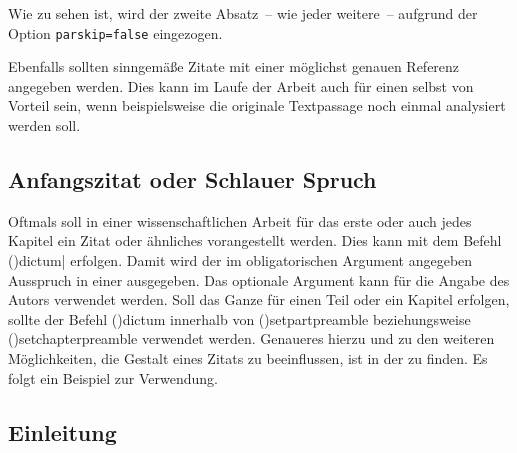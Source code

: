 \documentclass[%
  english,ngerman,%
  cdgeometry=no,DIV=12,%
  cd=false,cdfont=false,cdtitle=true,%
  headings=normal,%
  automark,%
  listof=toc,%
]{tudscrartcl}
\begin{document}
\begin{refsection}
\begin{Trunk*}
\begin{quoting}
{  Wie zu sehen ist, wird der zweite Absatz~-- wie jeder weitere~-- 
  aufgrund der Option \texttt{parskip=false} eingezogen.
}
\cite[sinngemäß nach][\pno{} 12, zweiter Absatz]{hanisch19}
\end{quoting}
\end{Trunk*}
\begin{Trunk+}
Ebenfalls sollten sinngemäße Zitate mit einer möglichst genauen Referenz 
angegeben werden. Dies kann im Laufe der Arbeit auch für einen selbst von 
Vorteil sein, wenn beispielsweise die originale Textpassage noch einmal 
analysiert werden soll.

\end{Trunk+}
\begin{quoting}[rightmargin=0pt]
\makeatletter
\let\markboth\@gobbletwo
\let\markright\@gobble
\makeatother
\printbibliography
\end{quoting}
\end{refsection}



\section{Anfangszitat oder Schlauer Spruch}

\renewcommand*\dictumwidth{.4\textwidth}%
%
\bigskip\noindent
Oftmals soll in einer wissenschaftlichen Arbeit für das erste oder auch jedes 
Kapitel ein Zitat oder ähnliches vorangestellt werden. Dies kann mit dem Befehl
\Macro(){dictum|}
erfolgen. Damit wird der im obligatorischen Argument angegeben Ausspruch in 
einer  ausgegeben. Das optionale Argument kann für die Angabe 
des Autors verwendet werden. Soll das Ganze für einen Teil oder ein Kapitel 
erfolgen, sollte der Befehl \Macro(){dictum} innerhalb 
von \Macro(){setpartpreamble} beziehungsweise 
\Macro(){setchapterpreamble} verwendet werden. Genaueres 
hierzu und zu den weiteren Möglichkeiten, die Gestalt eines Zitats zu 
beeinflussen, ist in der  zu finden. Es 
folgt ein Beispiel zur Verwendung.
%
\begin{Hint}
\chapter{Einleitung}

\end{Hint}
\end{document}
